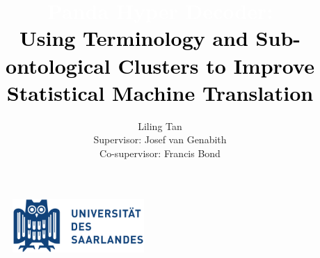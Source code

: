 \documentclass[a4paper,11pt,twoside]{report}
\begin{document}
\begin{figure}
\centering
\includegraphics[width=50mm,scale=0.5]{usaar}
\end{figure}

\title{\LARGE \textcolor{white}{\bf Panda Hyper Decoder:} \\
\textcolor{black}{\Huge Using Terminology and Sub-ontological Clusters to Improve Statistical Machine Translation}
}

\author{Liling Tan \\ \vspace{20mm}
Supervisor: Josef van Genabith \\ \vspace{2mm}
Co-supervisor: Francis Bond}


\normallinespacing
 \maketitle


\preface






%
%
%


\body














\end{document}
